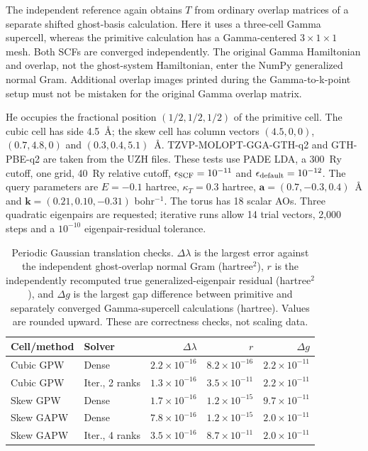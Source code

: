 \documentclass[11pt]{article}
\begin{document}
The independent reference again obtains $T$ from ordinary
overlap matrices of a separate shifted ghost-basis calculation.
Here it uses a three-cell Gamma supercell, whereas the primitive
calculation has a Gamma-centered $3\times1\times1$ mesh. Both
SCFs are converged independently. The original Gamma Hamiltonian
and overlap, not the ghost-system Hamiltonian, enter the NumPy
generalized normal Gram. Additional overlap images printed during
the Gamma-to-k-point setup must not be mistaken for the original
Gamma overlap matrix.

He occupies the fractional position $(1/2,1/2,1/2)$ of the
primitive cell. The cubic cell has side 4.5~\AA; the skew cell
has column vectors $(4.5,0,0)$, $(0.7,4.8,0)$ and
$(0.3,0.4,5.1)$~\AA. TZVP-MOLOPT-GGA-GTH-q2 and GTH-PBE-q2
are taken from the UZH files. These tests use PADE LDA, a
300~Ry cutoff, one grid, 40~Ry relative cutoff,
$\epsilon_{\rm SCF}=10^{-11}$ and
$\epsilon_{\rm default}=10^{-12}$. The query parameters are
$E=-0.1$ hartree, $\kappa_T=0.3$ hartree,
$\bm a=(0.7,-0.3,0.4)$~\AA{} and
$\bm k=(0.21,0.10,-0.31)$ bohr$^{-1}$.
The torus has 18 scalar AOs. Three quadratic eigenpairs are
requested; iterative runs allow 14 trial vectors, 2,000 steps
and a $10^{-10}$ eigenpair-residual tolerance.

\begin{table}[htbp]
\centering\small
\caption{Periodic Gaussian translation checks. $\Delta\lambda$
is the largest error against the independent ghost-overlap normal
Gram (hartree$^2$), $r$ is the independently recomputed true
generalized-eigenpair residual (hartree$^2$), and $\Delta g$ is
the largest gap difference between primitive and separately
converged Gamma-supercell calculations (hartree). Values are
rounded upward. These are correctness checks, not scaling data.}
\label{tab:torus-translation}
\begin{tabular}{llrrr}
\toprule
Cell/method & Solver & $\Delta\lambda$ & $r$ & $\Delta g$\\
\midrule
Cubic GPW & Dense & $2.2\times10^{-16}$ & $8.2\times10^{-16}$ & $2.2\times10^{-11}$\\
Cubic GPW & Iter., 2 ranks & $1.3\times10^{-16}$ & $3.5\times10^{-11}$ & $2.2\times10^{-11}$\\
Skew GPW & Dense & $1.7\times10^{-16}$ & $1.2\times10^{-15}$ & $9.7\times10^{-11}$\\
Skew GAPW & Dense & $7.8\times10^{-16}$ & $1.2\times10^{-15}$ & $2.0\times10^{-11}$\\
Skew GAPW & Iter., 4 ranks & $3.5\times10^{-16}$ & $8.7\times10^{-11}$ & $2.0\times10^{-11}$\\
\bottomrule
\end{tabular}
\end{table}
\end{document}
